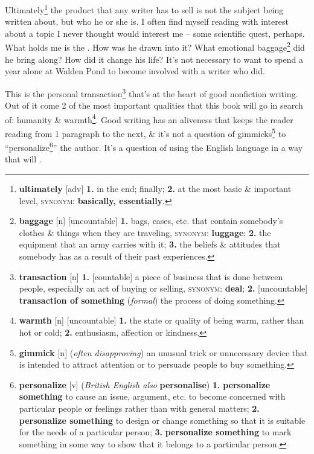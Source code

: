 \documentclass[oneside]{book}
\numberwithin{equation}{section}
\begin{document}
Ultimately\footnote{\textbf{ultimately} [adv] \textbf{1.} in the end; finally; \textbf{2.} at the most basic \& important level, \textsc{synonym}: \textbf{basically, essentially}.} the product that any writer has to sell is not the subject being written about, but who he or she is. I often find myself reading with interest about a topic I never thought would interest me -- some scientific quest, perhaps. What holds me is the . How was he drawn into it? What emotional baggage\footnote{\textbf{baggage} [n] [uncountable] \textbf{1.} bags, cases, etc. that contain somebody's clothes \& things when they are traveling, \textsc{synonym}: \textbf{luggage}; \textbf{2.} the equipment that an army carries with it; \textbf{3.} the beliefs \& attitudes that somebody has as a result of their past experiences.} did he bring along? How did it change his life? It's not necessary to want to spend a year alone at Walden Pond to become involved with a writer who did.

This is the personal transaction\footnote{\textbf{transaction} [n] \textbf{1.} [countable] a piece of business that is done between people, especially an act of buying or selling, \textsc{synonym}: \textbf{deal}; \textbf{2.} [uncountable] \textbf{transaction of something} (\textit{formal}) the process of doing something.} that's at the heart of good nonfiction writing. Out of it come 2 of the most important qualities that this book will go in search of: humanity \& warmth\footnote{\textbf{warmth} [n] [uncountable] \textbf{1.} the state or quality of being warm, rather than hot or cold; \textbf{2.} enthusiasm, affection or kindness.}. Good writing has an aliveness that keeps the reader reading from 1 paragraph to the next, \& it's not a question of gimmicks\footnote{\textbf{gimmick} [n] (\textit{often disapproving}) an unusual trick or unnecessary device that is intended to attract attention or to persuade people to buy something.} to ``personalize\footnote{\textbf{personalize} [v] (\textit{British English also} \textbf{personalise}) \textbf{1.} \textbf{personalize something} to cause an issue, argument, etc. to become concerned with particular people or feelings rather than with general matters; \textbf{2.} \textbf{personalize something} to design or change something so that it is suitable for the needs of a particular person; \textbf{3.} \textbf{personalize something} to mark something in some way to show that it belongs to a particular person.}'' the author. It's a question of using the English language in a way that will .
\end{document}
